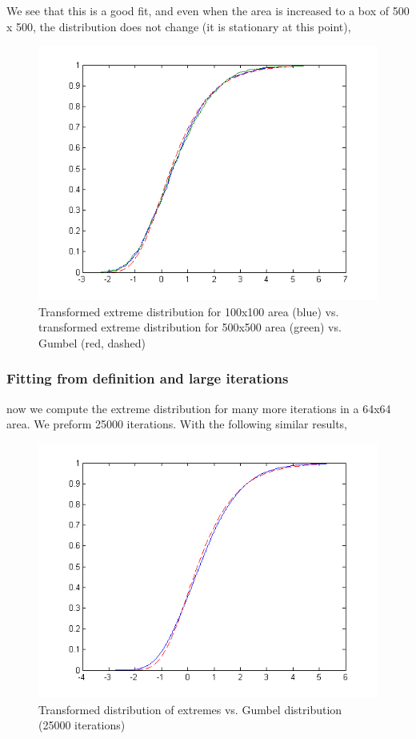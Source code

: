 \documentclass[12pt]{article}
\begin{document}
We see that this is a good fit, and even when the area is increased to a box of 500 x 500, the distribution does not change (it is stationary at this point),

\begin{figure}[hpt]
	\centering
		\includegraphics[width=1.00\textwidth]{extremeDistVsGumb.png}
	\caption{Transformed extreme distribution for 100x100 area (blue) vs. transformed extreme distribution for 500x500 area (green) vs. Gumbel (red, dashed)}
	\label{fig:extremeDistVsGumb}
\end{figure}

\pagebreak

\subsubsection{Fitting from definition and large iterations}

now we compute the extreme distribution for many more iterations in a 64x64 area. We preform 25000 iterations. With the following similar results,

\begin{figure}[hpt]
	\centering
		\includegraphics[width=1.00\textwidth]{25000it128x128gumb.png}
	\caption{Transformed distribution of extremes vs. Gumbel distribution (25000 iterations)}
	\label{fig:25000it128x128gumb}
\end{figure}
\end{document}
